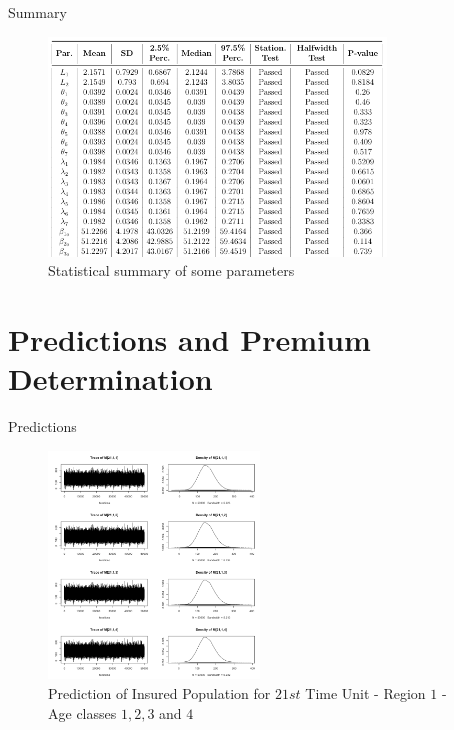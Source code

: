 \documentclass[10pt]{beamer} %
\begin{document}
\begin{frame}{Summary}
    \begin{figure}
        \centering
        \includegraphics[width=0.8\textwidth ]{summary1.png}
        \caption{Statistical summary of some parameters}
        \label{fig:summary}
    \end{figure}
\end{frame}

\section{Predictions and Premium Determination}
\begin{frame}{Predictions}
    \begin{figure}[H]
    \centering
    \includegraphics[width=0.5\textwidth ]{M21_1.png}
    \caption{Prediction of Insured Population for $21st$ Time Unit - Region $1$ - Age classes $1,2, 3$ and $4$}
    \label{predictionM1}
\end{figure}
\end{frame}
\end{document}

